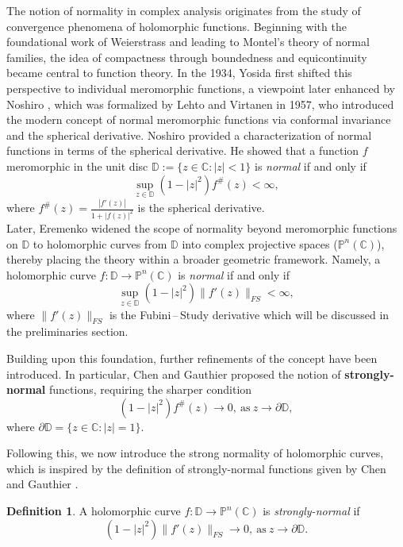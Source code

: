 \documentclass[11pt, reqno]{amsart}
\theoremstyle{definition}
\newtheorem{definition}[theorem]{Definition}
\theoremstyle{remark}
\numberwithin{equation}{section}
\begin{document}
The notion of normality in complex analysis originates from the study of convergence phenomena of 
holomorphic functions. Beginning with the foundational work of Weierstrass and leading to 
Montel’s theory of normal families, the idea of compactness through boundedness and equicontinuity 
became central to function theory. In the 1934, Yosida \cite{yosida-oacomf-1934} first shifted this 
perspective to individual meromorphic functions, a viewpoint later enhanced by Noshiro \cite{noshiro-ctttomfituc-1938}, which was formalized by Lehto and 
Virtanen \cite{lehto-bbanmf-1957} in 1957, who introduced the modern concept of normal meromorphic functions via conformal invariance and the spherical 
derivative. Noshiro \cite{noshiro-ctttomfituc-1938} provided a characterization of normal functions in terms of the spherical derivative. He showed that a 
function $f$ meromorphic in the unit disc $\mathbb{D}:=\{z\in\mathbb C:|z|<1\}$ is \emph{normal} if and only if \begin{equation*}
\sup_{z\in\mathbb{D}}(1-|z|^2)f^\#(z)<\infty ,   
\end{equation*} where $\displaystyle f^\#(z)=\frac{|f'(z)|}{1+|f(z)|^2}$ is the spherical derivative.\\

Later, Eremenko \cite{eremenko-nhcfprtps-2007} widened the scope of normality beyond meromorphic functions on $\mathbb D$ to holomorphic curves from
$\mathbb D$ into complex projective spaces ($\mathbb P^n(\mathbb C)$), thereby placing the theory within a broader geometric framework. Namely, a holomorphic curve $f:\mathbb D\to \mathbb P^n(\mathbb C)$ is \emph{normal} if and only if 
\begin{equation*}\sup_{z\in\mathbb D}(1-|z|^2)\|f'(z)\|_{FS}<\infty,\end{equation*}
where $\|f'(z)\|_{FS}$ is the Fubini\,--\,Study derivative which will be discussed in the preliminaries section.
\smallskip

Building upon this foundation, further refinements of the concept have been introduced. In particular, Chen and Gauthier \cite{chen-osnf-1996} proposed the 
notion of \textbf{strongly-normal} functions, requiring the sharper condition
\begin{equation*}(1-|z|^2)f^\#(z)\to 0,\ \text{as}\ z\to \partial \mathbb{D},\end{equation*}
where $\partial\mathbb D=\{z\in\mathbb C:|z|=1\}$. 
\smallskip

Following this, we now introduce the strong normality of holomorphic curves, which
is inspired by the definition of strongly-normal functions given by Chen and Gauthier \cite{chen-osnf-1996}.
\begin{definition}
A holomorphic curve $f:\mathbb{D}\to \mathbb P^n(\mathbb C)$ is \emph{strongly-normal} if 
\begin{equation*}(1-|z|^2)\|f'(z)\|_{FS}\to 0,\ \text{as}\ z\to\partial\mathbb{D}.\end{equation*}
\end{definition}
\end{document}
